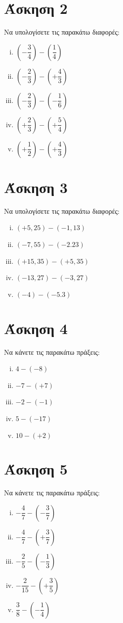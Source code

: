 \documentclass[a4paper,10pt]{report}
\begin{document}
\section*{Άσκηση 2  \hfill \small{}}%
Να υπολογίσετε τις παρακάτω διαφορές:
\begin{enumerate}[i)]
\item $(-\dfrac{3}{4})-(\dfrac{1}{4})$
\item $(-\dfrac{2}{3})-(+\dfrac{4}{3})$
\item $(-\dfrac{2}{3})-(-\dfrac{1}{6})$
\item $(+\dfrac{2}{3})-(+\dfrac{5}{4})$
\item $(+\dfrac{1}{2})-(+\dfrac{4}{3})$
\end{enumerate}


\section*{Άσκηση 3  \hfill \small{}}%
Να υπολογίσετε τις παρακάτω διαφορές:
\begin{enumerate}[i)]
\item $(+5,25)-(-1,13)$
\item $(-7,55)-(-2.23)$
\item $(+15,35)-(+5,35)$
\item $(-13,27)-(-3,27)$
\item $(-4)-(-5.3)$
\end{enumerate}


\section*{Άσκηση 4  \hfill \small{}}%
Να κάνετε τις παρακάτω πράξεις:
\begin{enumerate}[i)]
\item $4-(-8)$
\item $-7-(+7)$
\item $-2-(-1)$
\item $5-(-17)$
\item $10-(+2)$
\end{enumerate}


\section*{Άσκηση 5  \hfill \small{}}%
Να κάνετε τις παρακάτω πράξεις:
\begin{enumerate}[i)]
\item $-\dfrac{4}{7}-(-\dfrac{3}{7})$
\item $-\dfrac{4}{7}-(+\dfrac{3}{7})$
\item $-\dfrac{2}{5}-(-\dfrac{1}{3})$
\item $-\dfrac{2}{15}-(+\dfrac{3}{5})$
\item $\dfrac{3}{8}-(-\dfrac{1}{4})$
\end{enumerate}
\end{document}
